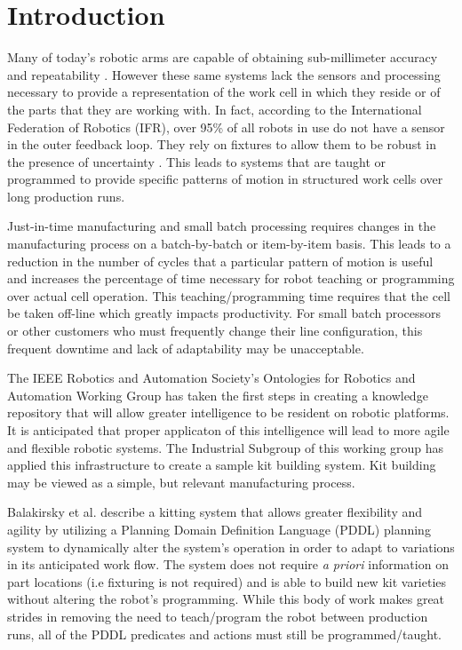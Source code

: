 \section{Introduction}
Many of today's robotic arms are capable of obtaining
sub-millimeter accuracy and repeatability \cite{RobotAccuracy}. However these
same systems lack
the sensors and processing necessary to provide a representation of
the work cell in which they reside or of the parts that they are working
with. In fact, according to the International Federation of Robotics (IFR),
over 95\% of all robots in use do not have a sensor in the outer feedback loop.
They rely on fixtures to allow them to be robust in the presence of 
uncertainty \cite{WorldRobot}. This leads to
systems that are taught or programmed to provide specific patterns of motion in
structured work cells over long production runs. 

Just-in-time manufacturing and small
batch processing requires changes in the manufacturing process on a batch-by-batch
or item-by-item basis. This leads to a reduction in the number of cycles
that a particular pattern of motion is useful and increases the 
percentage of time necessary for robot teaching or programming over actual cell operation.
This teaching/programming time requires that the 
cell be taken off-line which greatly impacts productivity.
For small batch processors or other customers who must frequently change their line configuration, 
this frequent downtime and lack of adaptability may be unacceptable.

The IEEE Robotics and Automation Society's Ontologies for Robotics and Automation Working Group has taken the 
first steps in creating a knowledge repository that will
allow greater intelligence to be resident on robotic platforms.
It is anticipated that proper applicaton of this intelligence
will lead to more agile and flexible robotic systems. The 
Industrial Subgroup of this working group has applied 
this infrastructure to 
create a sample kit building
system.  Kit building may be viewed as a simple, but relevant
manufacturing process. 

Balakirsky et al. \cite{Balakirsky2013} describe a kitting 
system that
allows greater flexibility and agility by utilizing a
Planning Domain Definition Language (PDDL) \cite{PDDL} planning
system to dynamically alter the system's operation in order
to adapt to variations in its anticipated work flow. The system
does not require {\it a priori} information on part locations (i.e
fixturing is not required) and is able to build new kit varieties
without altering the robot's programming. While this body of
work makes great strides in removing the need to teach/program
the robot between production runs, all of the PDDL predicates and
actions must still be programmed/taught. 

